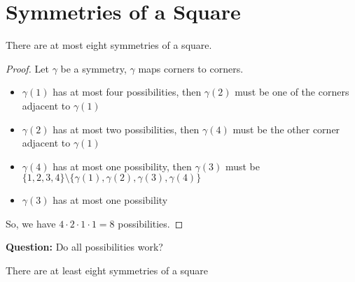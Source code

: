 \documentclass[openany]{report}
\begin{document}
\section{Symmetries of a Square}
\begin{lemma}
There are at most eight symmetries of a square.
\end{lemma}
\begin{proof}
Let $\gamma$ be a symmetry, $\gamma$ maps corners to corners.
\begin{itemize}
    \item $\gamma(1)$ has at most four possibilities, then $\gamma(2)$ must be one of the corners adjacent to $\gamma(1)$
    \item $\gamma(2)$ has at most two possibilities, then $\gamma(4)$ must be the other corner adjacent to $\gamma(1)$
    \item $\gamma(4)$ has at most one possibility, then $\gamma(3)$ must be $\{1,2,3,4\} \setminus \{\gamma(1), \gamma(2), \gamma(3), \gamma(4)\}$
    \item $\gamma(3)$ has at most one possibility
\end{itemize} 
So, we have $4 \cdot 2 \cdot 1 \cdot 1 = 8$ possibilities.
\end{proof}
\noindent
\textbf{Question:} Do  all possibilities work?
\begin{lemma}
    There are at least eight symmetries of a square 
\end{lemma}
\end{document}
